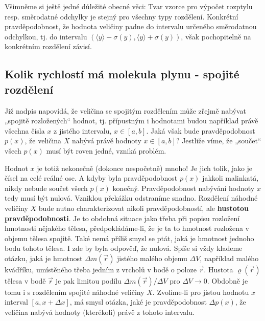     Všimněme si ještě jedné důležité obecné věci: Tvar vzorce pro výpočet rozptylu resp. směrodatné 
    odchylky je stejný pro všechny typy rozdělení. Konkrétní pravděpodobnost, že hodnota
    veličiny padne do intervalu určeného směrodatnou odchylkou, tj. do intervalu \((\langle y 
    \rangle - \sigma(y), \langle y \rangle + \sigma(y))\), však pochopitelně na konkrétním 
    rozdělení závisí.

    
    
    \subsection{Kolik rychlostí má molekula plynu - spojité rozdělení}
      Již nadpis napovídá, že veličina se spojitým rozdělením může zřejmě nabývat „spojitě 
      rozložených“ hodnot, tj. přípustným i hodnotami budou například právě všechna čísla \(x\) z 
      jistého intervalu, \(x\in[a, b]\). Jaká však bude pravděpodobnost \(p(x)\), že veličina \(X\) 
      nabývá právě hodnoty \(x\in[a, b]\)? Jestliže víme, že „součet“ všech \(p(x)\) musí být roven 
      jedné, vzniká problém.
      
      Hodnot \(x\) je totiž nekonečně (dokonce nespočetně) mnoho! Je jich tolik, jako je čísel na 
      celé reálné ose. A kdyby byla pravděpodobnost \(p(x)\) jakkoli malinkatá, nikdy nebude součet 
      všech \(p(x)\) konečný. Pravděpodobnost nabývání hodnoty \(x\) tedy musí být nulová. Vzniklou 
      překážku odstraníme snadno. Rozdělení náhodné veličiny \(X\) bude nutno charakterizovat 
      nikoli pravděpodobností, ale \textbf{hustotou pravděpodobnosti}. Je to obdobná situace jako 
      třeba při popisu rozložení hmotnosti nějakého tělesa, předpokládáme-li, že je ta to hmotnost 
      rozložena v objemu tělesa spojitě. Také nemá příliš smysl se ptát, jaká je hmotnost jednoho 
      bodu tohoto tělesa. I zde by byla odpověď, že nulová. Spíše si vždy klademe otázku, jaká je 
      hmotnost \(\Delta m(\vec{r})\) jistého malého objemu \(\Delta V\), například malého kvádříku, 
      umístěného třeba jedním z vrcholů v bodě o poloze \(\vec{r}\). Hustota \(\varrho(\vec{r})\) 
      tělesa v bodě \(\vec{r}\) je pak limitou podílu \(\Delta m(\vec{r})/\Delta V\) pro \(\Delta V 
      \longrightarrow 0\). Obdobně je tomu i s rozdělením spojité náhodné veličiny \(X\). 
      Zvolíme-li pro jistou hodnotu \(x\) interval \([a, x + \Delta x]\), má smysl otázka, jaké je 
      pravděpodobnost \(\Delta p(x)\), že veličina nabývá hodnoty (kterékoli) právě z tohoto 
      intervalu.


